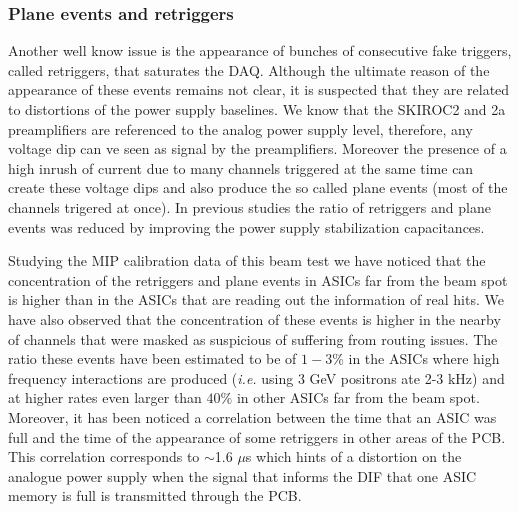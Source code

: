 \documentclass[a4paper,11pt]{article}
\begin{document}
\subsubsection*{Plane events and retriggers}

Another well know issue is the appearance of bunches of consecutive fake triggers, called retriggers,
that saturates the DAQ. 
Although the ultimate reason of the appearance of these events remains not clear, it
is suspected that they are related to distortions of the
power supply baselines. We know that the SKIROC2 and 2a preamplifiers are referenced to the analog power supply level,
therefore, any voltage dip can ve seen as signal by the preamplifiers.
Moreover the presence of a high inrush of current
due to many channels triggered at the same time can create these voltage dips
and also produce the so called plane events (most of the channels trigered at once).
In previous studies the ratio of retriggers and plane events
was reduced by improving the power supply stabilization capacitances. %

Studying the MIP calibration data of this beam test we have noticed that the 
concentration of the retriggers and plane events in
ASICs far from the beam spot is higher than in the ASICs that are reading
out the information of real hits. We have also observed that the concentration of these events
is higher in the nearby of channels that were masked as suspicious of suffering from routing issues.
The ratio these events have been estimated to be of $1-3\%$ in the ASICs where high frequency
interactions are produced ({\it i.e.} using 3 GeV positrons ate 2-3 kHz) and at higher rates even larger than $40\%$ in other 
ASICs far from the beam spot. 
Moreover, it has been noticed a correlation between the time that an ASIC was full and the time of the appearance of some 
retriggers in other areas of the PCB. 
This correlation corresponds to $\sim$1.6 $\mu$s which hints
of a distortion on the analogue power supply when
the signal that informs the DIF that one ASIC memory is full is transmitted through the PCB.





\end{document}
